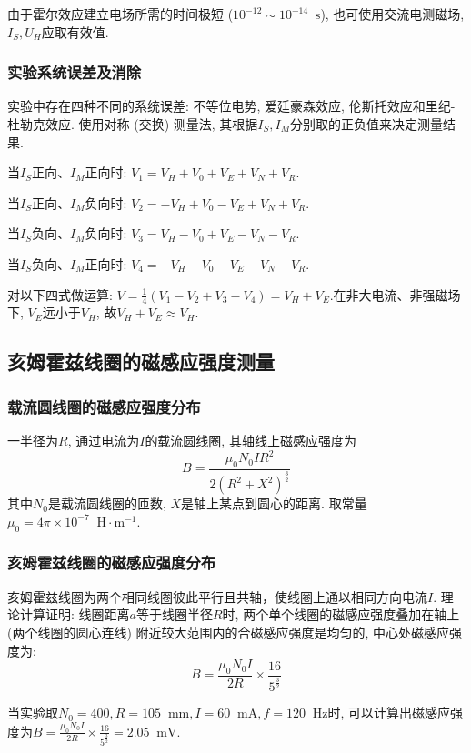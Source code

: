 \documentclass[11pt]{article}
\newcommand*{\unit}[1]{\mathop{}\!\mathrm{#1}}
\begin{document}
由于霍尔效应建立电场所需的时间极短 ($10^{-12}\sim10^{-14} \unit{s}$), 也可使用交流电测磁场, $I_S, U_H$应取有效值.

\subsubsection{实验系统误差及消除}

实验中存在四种不同的系统误差: 不等位电势, 爱廷豪森效应, 伦斯托效应和里纪-杜勒克效应. 使用对称 (交换) 测量法, 其根据$I_S,I_M$分别取的正负值来决定测量结果. 

当$I_S$正向、$I_M$正向时: $V_1 =  V_H + V_0 + V_E + V_N + V_R$.

当$I_S$正向、$I_M$负向时: $V_2 = -V_H + V_0 - V_E + V_N + V_R$.

当$I_S$负向、$I_M$负向时: $V_3 =  V_H - V_0 + V_E - V_N - V_R$.

当$I_S$负向、$I_M$正向时: $V_4 = -V_H - V_0 - V_E - V_N - V_R$.

对以下四式做运算: $V=\frac{1}{4}(V_1-V_2+V_3-V_4) = V_H + V_E $.在非大电流、非强磁场下, $V_E$远小于$V_H$, 故$V_H + V_E \approx V_H$. 

\subsection{亥姆霍兹线圈的磁感应强度测量}

\subsubsection{载流圆线圈的磁感应强度分布}

一半径为$R$, 通过电流为$I$的载流圆线圈, 其轴线上磁感应强度为
\[
    B = \frac{\mu_0 N_0 IR^2}{2 (R^2 + X^2)^{\frac{3}{2}}}
\]
其中$N_0$是载流圆线圈的匝数, $X$是轴上某点到圆心的距离. 取常量$\mu_0 = 4 \pi \times 10^{-7} \unit{H\cdot m^{-1}}$.

\subsubsection{亥姆霍兹线圈的磁感应强度分布}

亥姆霍兹线圈为两个相同线圈彼此平行且共轴，使线圈上通以相同方向电流$I$. 理论计算证明: 线圈距离$a$等于线圈半径$R$时, 两个单个线圈的磁感应强度叠加在轴上 (两个线圈的圆心连线) 附近较大范围内的合磁感应强度是均匀的, 中心处磁感应强度为:
\[
    B = \frac{\mu_0N_0I}{2R}\times\frac{16}{5^{\frac{3}{2}}}
\]

当实验取$N_0 = 400, R = 105 \unit{mm}, I = 60 \unit{mA}, f = 120 \unit{Hz}$时, 可以计算出磁感应强度为$B = \frac{\mu_0N_0I}{2R}\times\frac{16}{5^{\frac{3}{2}}} = 2.05 \unit{mV}$.
\end{document}
